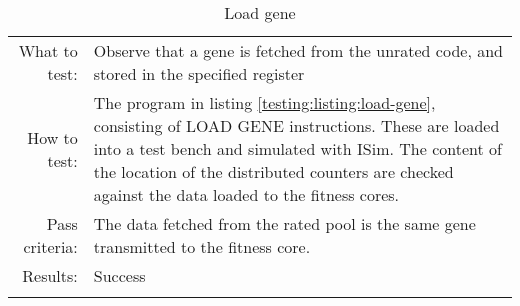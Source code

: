 \begin{table}[H]
  \begin{tabular}{r | p{8cm}}
    \noalign{\smallskip}\hline\noalign{\smallskip}
    
    What to test:  &  Observe that a gene is fetched from the unrated code, and stored in the
                      specified register\\

    \noalign{\smallskip}\hline\noalign{\smallskip}

    How to test:   &  The program in listing \ref{testing:listing:load-gene}, consisting of LOAD GENE
                      instructions. These are loaded into a test bench and simulated with 
                      ISim. The content of the location of the distributed counters are checked against the data 
                      loaded to the fitness cores.  \\

    \noalign{\smallskip}\hline\noalign{\smallskip}

    Pass criteria: &  The data fetched from the rated pool is the same gene transmitted to the
                      fitness core. \\

    \noalign{\smallskip}\hline\noalign{\smallskip}
    
    Results: &  Success \\
   \noalign{\smallskip}\hline\noalign{\smallskip}
  
  
  
  \end{tabular}
  \caption{Load gene}
  \label{testing:fitness:load_gene}
\end{table}
